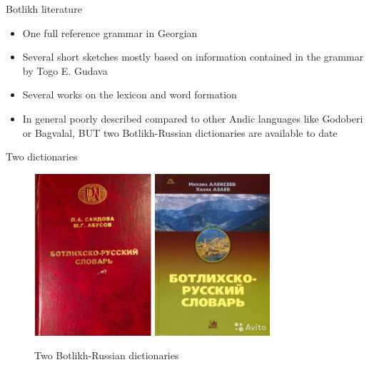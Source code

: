 \begin{frame}{Botlikh literature}
\begin{itemize}
    \item One full reference grammar in Georgian \citep{gudava1962}
    \item Several short sketches mostly based on information contained in the grammar by Togo E. Gudava \citep{gudava1967, azaev2000, saidova2001, magomedbekova2001, xalidova2017, alekseevverhees}
    \item Several works on the lexicon and word formation \citep{azaev1975, sulejmanova2013, alekseev2016}
    \item In general poorly described compared to other Andic languages like Godoberi or Bagvalal, BUT two Botlikh-Russian dictionaries are available to date \citep{saidovaabusov2012, alekseev2019}
\end{itemize}
\end{frame}

\begin{frame}{Two dictionaries}
\begin{figure}[h]
\includegraphics[height=6cm]{images/abusov2012.jpg} 
\includegraphics[height=6cm]{images/alekseev2019.jpg}
\label{two_dicts}
\caption{Two Botlikh-Russian dictionaries}
\end{figure}
\end{frame}

